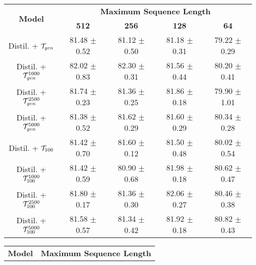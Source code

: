 \begin{table*}[t]
\begin{subtable}{\textwidth}
\begin{tabular}{ccccc}
            \multirow{2}{*}{\textbf{Model}}         & \multicolumn{4}{c}{\textbf{Maximum Sequence Length}}  \\          
            
                                                    & \textbf{512}  & \textbf{256}   & \textbf{128}   & \textbf{64} \\ 
            
            \hline
    
            Distil. + $\mathcal{T}_{gen}$                     & 81.48 $\pm$ 0.52      & 81.12 $\pm$ 0.50      & 81.18 $\pm$ 0.31      & 79.22 $\pm$ 0.29  \\
            Distil. + $\mathcal{T}_{gen}^{1000}$              & 82.02 $\pm$ 0.83      & 82.30 $\pm$ 0.31      & 81.56 $\pm$ 0.44      & 80.20 $\pm$ 0.41  \\
            Distil. + $\mathcal{T}_{gen}^{2500}$              & 81.74 $\pm$ 0.23      & 81.36 $\pm$ 0.25      & 81.86 $\pm$ 0.18      & 79.90 $\pm$ 1.01  \\
            Distil. + $\mathcal{T}_{gen}^{5000}$              & 81.38 $\pm$ 0.52      & 81.62 $\pm$ 0.29      & 81.60 $\pm$ 0.29      & 80.34 $\pm$ 0.28  \\
            Distil. + $\tok100$                     & 81.42 $\pm$ 0.70      & 81.60 $\pm$ 0.12      & 81.50 $\pm$ 0.48      & 80.02 $\pm$ 0.54  \\
            Distil. + $\tok100^{1000}$              & 81.42 $\pm$ 0.59      & 80.90 $\pm$ 0.68      & 81.98 $\pm$ 0.18      & 80.62 $\pm$ 0.47  \\
            Distil. + $\tok100^{2500}$              & 81.80 $\pm$ 0.17      & 81.36 $\pm$ 0.30      & 82.06 $\pm$ 0.27      & 80.46 $\pm$ 0.38  \\
            Distil. + $\tok100^{5000}$              & 81.58 $\pm$ 0.57      & 81.34 $\pm$ 0.42      & 81.92 $\pm$ 0.18      & 80.82 $\pm$ 0.43  \\
            
            \hline
        \end{tabular}
        \caption{LEDGAR}
    \end{subtable}

    \bigskip
    \begin{subtable}{\textwidth}
    \centering
        \begin{tabular}{ccccc}
            \hline
            
            \multirow{2}{*}{\textbf{Model}}         & \multicolumn{4}{c}{\textbf{Maximum Sequence Length}}  \\          
            

\end{tabular}
\end{subtable}
\end{table*}
